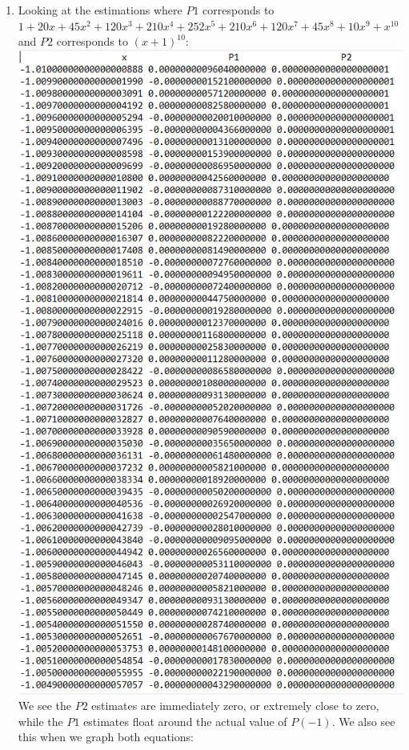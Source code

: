 \documentclass[12pt,letterpaper]{article}
\begin{document}
\begin{enumerate}
        \item
        Looking at the estimations where $P1$ corresponds to $1 + 20x + 45x^2 + 120x^3 + 210 x^4 + 252x^5 + 210x^6+120x^7 + 45x^8 + 10x^9 + x^{10}$
        and $P2$ corresponds to $(x+1)^{10}$: \\
        \includegraphics[scale = .8]{number4est.png}\\
        We see the $P2$ estimates are immediately zero, or extremely close to zero,
        while the $P1$ estimates float around the actual value of $P(-1)$. We also see this
        when we graph both equations: \\

\end{enumerate}
\end{document}
